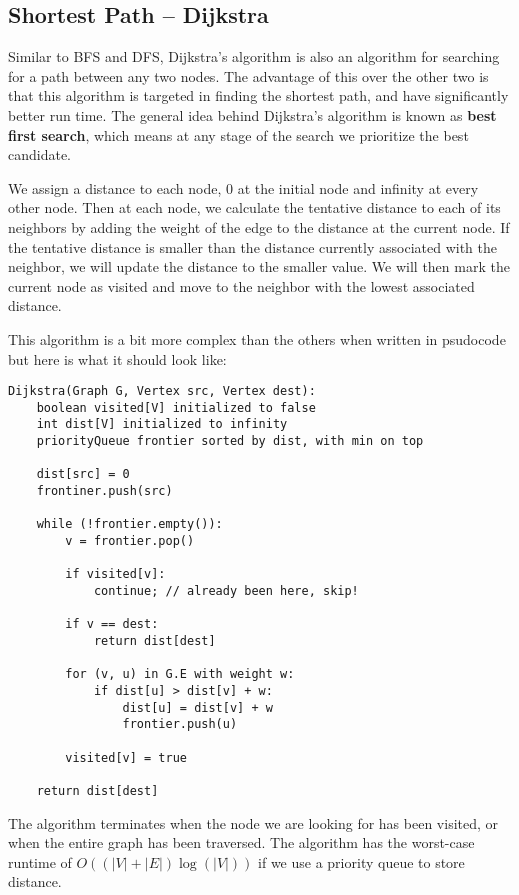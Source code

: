 \documentclass[12 pt, twoside] {article}
\begin{document}
{\subsection*{Shortest Path -- Dijkstra}

Similar to BFS and DFS, Dijkstra's algorithm is also an algorithm for searching
for a path between any two nodes. The advantage of this over the other two is
that this algorithm is targeted in finding the shortest path, and have
significantly better run time. The general idea behind Dijkstra's algorithm is
known as \textbf{best first search}, which means at any stage of the search we
prioritize the best candidate.

We assign a distance to each node, 0 at the initial node and infinity at every
other node. Then at each node, we calculate the tentative distance to each of
its neighbors by adding the weight of the edge to the distance at the current
node. If the tentative distance is smaller than the distance currently
associated with the neighbor, we will update the distance to the smaller value.
We will then mark the current node as visited and move to the neighbor with the
lowest associated distance.

This algorithm is a bit more complex than the others when written in psudocode
but here is what it should look like:
\begin{verbatim}
Dijkstra(Graph G, Vertex src, Vertex dest):
    boolean visited[V] initialized to false
    int dist[V] initialized to infinity
    priorityQueue frontier sorted by dist, with min on top

    dist[src] = 0
    frontiner.push(src)

    while (!frontier.empty()):
        v = frontier.pop()
        
        if visited[v]:
            continue; // already been here, skip!

        if v == dest:
            return dist[dest]

        for (v, u) in G.E with weight w:
            if dist[u] > dist[v] + w:
                dist[u] = dist[v] + w
                frontier.push(u)

        visited[v] = true

    return dist[dest]
\end{verbatim}

The algorithm terminates when the node we are looking for has been visited, or
when the entire graph has been traversed. The algorithm has the worst-case
runtime of $O((|V| + |E|) \log(|V|))$ if we use a priority queue to store
distance.

}
\end{document}
